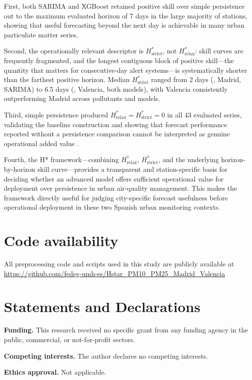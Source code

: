 \documentclass[12pt, a4paper]{article}
\newcommand{\Hrelax}{H^{*}_{\mathrm{relax}}}
\newcommand{\Hstrict}{H^{*}_{\mathrm{strict}}}
\begin{document}
First, both SARIMA and XGBoost retained positive skill over simple
persistence out to the maximum evaluated horizon of 7 days in the
large majority of stations, showing that useful forecasting beyond
the next day is achievable in many urban particulate matter series.

Second, the operationally relevant descriptor is $\Hstrict$, not
$\Hrelax$: skill curves are frequently fragmented, and the longest
contiguous block of positive skill—the quantity that matters for
consecutive-day alert systems—is systematically shorter than the
farthest positive horizon.
Median $\Hstrict$ ranged from 2 days (, Madrid, SARIMA)
to 6.5 days (, Valencia, both models), with Valencia
consistently outperforming Madrid across pollutants and models.

Third, simple persistence produced $\Hrelax = \Hstrict = 0$ in all
43 evaluated series, validating the baseline construction and showing
that forecast performance reported without a persistence comparison
cannot be interpreted as genuine operational added value
\citep{GarciaCrespi2026}.

Fourth, the H* framework—combining $\Hrelax$, $\Hstrict$, and the
underlying horizon-by-horizon skill curve—provides a transparent and
station-specific basis for deciding whether an advanced model offers
sufficient operational value for deployment over persistence in
urban air-quality management. This makes the framework directly
useful for judging city-specific forecast usefulness before
operational deployment in these two Spanish urban monitoring contexts.

\section*{Code availability}
All preprocessing code and scripts used in this study are publicly available at
\url{https://github.com/fedeg-umh-es/Hstar_PM10_PM25_Madrid_Valencia}

\section*{Statements and Declarations}

\textbf{Funding.} This research received no specific grant
from any funding agency in the public, commercial, or
not-for-profit sectors.

\textbf{Competing interests.} The author declares no
competing interests.

\textbf{Ethics approval.} Not applicable.
\end{document}
